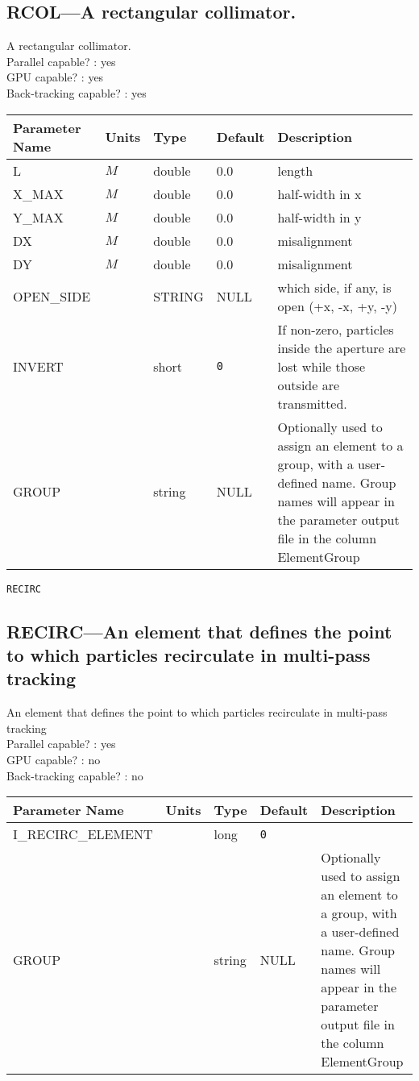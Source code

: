 \subsection{RCOL---A rectangular collimator.}
A rectangular collimator.
\\
Parallel capable? : yes\\
GPU capable? : yes\\
Back-tracking capable? : yes\\
\begin{tabular}{|l|l|l|l|p{\descwidth}|} \hline
Parameter Name & Units & Type & Default & Description \\ \hline 
L & $M$ & double &  0.0 & length  \\ \hline 
X\_MAX & $M$ & double &  0.0 & half-width in x  \\ \hline 
Y\_MAX & $M$ & double &  0.0 & half-width in y  \\ \hline 
DX & $M$ & double &  0.0 & misalignment  \\ \hline 
DY & $M$ & double &  0.0 & misalignment  \\ \hline 
OPEN\_SIDE &  & STRING &   NULL            & which side, if any, is open (+x, -x, +y, -y)  \\ \hline 
INVERT &  & short &  \verb|0| & If non-zero, particles inside the aperture are lost while those outside are transmitted.  \\ \hline 
GROUP &  & string & NULL & Optionally used to assign an element to a group, with a user-defined name.  Group names will appear in the parameter output file in the column ElementGroup  \\ \hline 
\end{tabular}

\newpage
\begin{center}{\Large\verb|RECIRC|}\end{center}
\subsection{RECIRC---An element that defines the point to which particles recirculate in multi-pass tracking}
An element that defines the point to which particles recirculate in multi-pass tracking
\\
Parallel capable? : yes\\
GPU capable? : no\\
Back-tracking capable? : no\\
\begin{tabular}{|l|l|l|l|p{\descwidth}|} \hline
Parameter Name & Units & Type & Default & Description \\ \hline 
I\_RECIRC\_ELEMENT &  & long &  \verb|0| & \\ \hline 
GROUP &  & string & NULL & Optionally used to assign an element to a group, with a user-defined name.  Group names will appear in the parameter output file in the column ElementGroup  \\ \hline 
\end{tabular}

